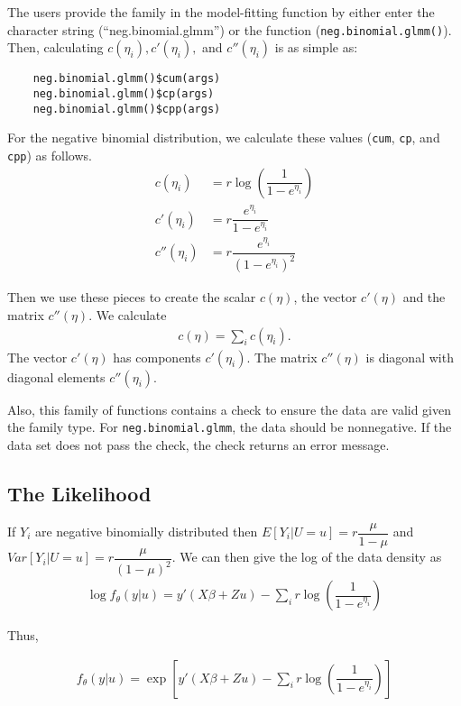 \documentclass{article}
\begin{document}
    The users provide the family in the model-fitting function by either enter the character string (``neg.binomial.glmm'') or the function (\texttt{neg.binomial.glmm()}). Then, calculating $c(\eta_i), c'(\eta_i),$ and  $c''(\eta_i)$ is as simple as: 
    \begin{verbatim}
    neg.binomial.glmm()$cum(args)
    neg.binomial.glmm()$cp(args)
    neg.binomial.glmm()$cpp(args)
    \end{verbatim}
    
    \noindent For the negative binomial distribution, we calculate these values (\texttt{cum}, \texttt{cp}, and \texttt{cpp}) as follows.
    \begin{align}
    c(\eta_i)&=r \log \left( \dfrac{1}{1-e^{\eta_i}} \right) \\
    c'(\eta_i)&= r \dfrac{e^{\eta_i}}{1-e^{\eta_i}} \\
    c''(\eta_i)&= r \dfrac{e^{\eta_i}}{ \left( 1- e^{\eta_i} \right) ^2}
    \end{align}
    
    \noindent Then we use these pieces to create the scalar $c(\eta)$, the vector $c'(\eta)$ and the matrix $c''(\eta)$. We calculate
    \begin{align}
    c(\eta)= \sum_i c(\eta_i).
    \end{align}
    The vector $c'(\eta)$ has components $c'(\eta_i)$. The matrix $c''(\eta)$ is diagonal with diagonal elements $c''(\eta_i)$.
    
    Also, this family of functions contains a check to ensure the data are valid given the family type. For \texttt{neg.binomial.glmm}, the data should be nonnegative.  If the data set does not pass the check, the check returns an error message. 
    
    \subsection{The Likelihood}
        If $Y_i$ are negative binomially distributed then $E[Y_i|U=u]=r \dfrac{\mu}{1-\mu}$ and $Var[Y_i|U=u] = r \dfrac{\mu}{(1-\mu)^2}$. We can then give the log of the data density as
        \begin{align}
        \log f_{\theta}(y|u) = y'(X \beta + Z u) - \sum_i r \log \left( \dfrac{1}{1-e^{\eta_i}} \right)
        \end{align}
        
        \noindent Thus,
        
        \begin{align}
        f_{\theta}(y|u) = \exp \left[ y' (X \beta + Z u) - \sum_i r \log \left( \dfrac{1}{1-e^{\eta_i}} \right) \right]
        \end{align}
\end{document}
